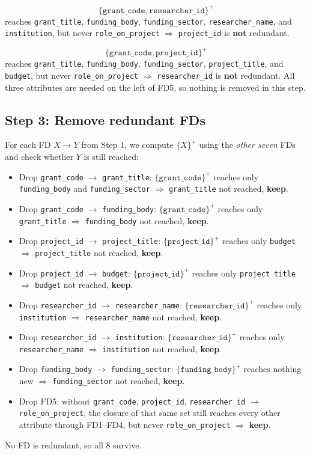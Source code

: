 \documentclass[11pt, letterpaper]{article}
\newcommand{\attr}[1]{\texttt{#1}}
\newcommand{\fd}{\ensuremath{\rightarrow}}
\newcommand{\clo}[1]{\ensuremath{\{#1\}^{+}}}
\begin{document}
\[
\clo{\attr{grant\_code}, \attr{researcher\_id}}
\]
reaches \attr{grant\_title}, \attr{funding\_body}, \attr{funding\_sector}, \attr{researcher\_name}, and \attr{institution}, but never \attr{role\_on\_project} $\Rightarrow$ \attr{project\_id} is \textbf{not} redundant.

\[
\clo{\attr{grant\_code}, \attr{project\_id}}
\]
reaches \attr{grant\_title}, \attr{funding\_body}, \attr{funding\_sector}, \attr{project\_title}, and \attr{budget}, but never \attr{role\_on\_project} $\Rightarrow$ \attr{researcher\_id} is \textbf{not} redundant.
All three attributes are needed on the left of FD5, so nothing is removed in this step.

\subsection*{Step 3: Remove redundant FDs}
For each FD $X \fd Y$ from Step 1, we compute $\clo{X}$ using the \emph{other seven} FDs and check whether $Y$ is still reached:
\begin{itemize}
  \item Drop \attr{grant\_code} \fd{} \attr{grant\_title}: $\clo{\attr{grant\_code}}$ reaches only \attr{funding\_body} and \attr{funding\_sector} $\Rightarrow$ \attr{grant\_title} not reached, \textbf{keep}.
  \item Drop \attr{grant\_code} \fd{} \attr{funding\_body}: $\clo{\attr{grant\_code}}$ reaches only \attr{grant\_title} $\Rightarrow$ \attr{funding\_body} not reached, \textbf{keep}.
  \item Drop \attr{project\_id} \fd{} \attr{project\_title}: $\clo{\attr{project\_id}}$ reaches only \attr{budget} $\Rightarrow$ \attr{project\_title} not reached, \textbf{keep}.
  \item Drop \attr{project\_id} \fd{} \attr{budget}: $\clo{\attr{project\_id}}$ reaches only \attr{project\_title} $\Rightarrow$ \attr{budget} not reached, \textbf{keep}.
  \item Drop \attr{researcher\_id} \fd{} \attr{researcher\_name}: $\clo{\attr{researcher\_id}}$ reaches only \attr{institution} $\Rightarrow$ \attr{researcher\_name} not reached, \textbf{keep}.
  \item Drop \attr{researcher\_id} \fd{} \attr{institution}: $\clo{\attr{researcher\_id}}$ reaches only \attr{researcher\_name} $\Rightarrow$ \attr{institution} not reached, \textbf{keep}.
  \item Drop \attr{funding\_body} \fd{} \attr{funding\_sector}: $\clo{\attr{funding\_body}}$ reaches nothing new $\Rightarrow$ \attr{funding\_sector} not reached, \textbf{keep}.
  \item Drop FD5: without \attr{grant\_code}, \attr{project\_id}, \attr{researcher\_id} \fd{} \attr{role\_on\_project}, the closure of that same set still reaches every other attribute through FD1--FD4, but never \attr{role\_on\_project} $\Rightarrow$ \textbf{keep}.
\end{itemize}
No FD is redundant, so all 8 survive.
\end{document}
